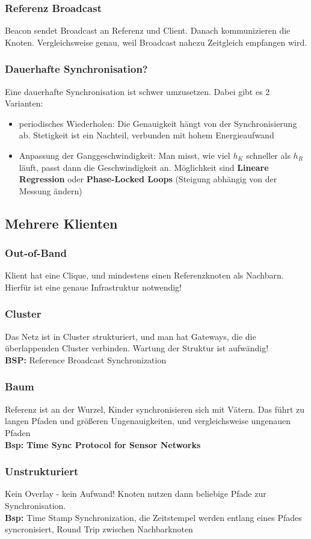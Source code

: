 \documentclass[a4paper]{article}
\begin{document}
\subsubsection{Referenz Broadcast}
Beacon sendet Broadcast an Referenz und Client. Danach kommunizieren die Knoten. Vergleichsweise genau, weil Broadcast nahezu Zeitgleich empfangen wird.
\subsubsection{Dauerhafte Synchronisation?}
Eine dauerhafte Synchronisation ist schwer umzusetzen. Dabei gibt es 2 Varianten:
\begin{itemize}
	\item periodisches Wiederholen: Die Genauigkeit hängt von der Synchronisierung ab. Stetigkeit ist ein Nachteil, verbunden mit hohem Energieaufwand
	\item Anpassung der Ganggeschwindigkeit: Man misst, wie viel $h_K$ schneller als $h_R$ läuft, passt dann die Geschwindigkeit an. Möglichkeit sind \textbf{Lineare Regression} oder \textbf{Phase-Locked Loops} (Steigung abhängig von der Messung ändern)
\end{itemize}
\subsection{Mehrere Klienten}
\subsubsection{Out-of-Band}
Klient hat eine Clique, und mindestens einen Referenzknoten als Nachbarn. Hierfür ist eine genaue Infrastruktur notwendig!
\subsubsection{Cluster}
Das Netz ist in Cluster strukturiert, und man hat Gateways, die die überlappenden Cluster verbinden. Wartung der Struktur ist aufwändig!\\
\textbf{BSP:} Reference Broadcast Synchronization
\subsubsection{Baum}
Referenz ist an der Wurzel, Kinder synchronisieren sich mit Vätern. Das führt zu langen Pfaden und größeren Ungenauigkeiten, und vergleichsweise ungenauen Pfaden\\
\textbf{Bsp:} \textbf{Time Sync Protocol for Sensor Networks}
\subsubsection{Unstrukturiert}
Kein Overlay - kein Aufwand! Knoten nutzen dann beliebige Pfade zur Synchronisation.\\
\textbf{Bsp:} Time Stamp Synchronization, die Zeitstempel werden entlang eines Pfades syncronisiert, Round Trip zwischen Nachbarknoten
	
\end{document}
